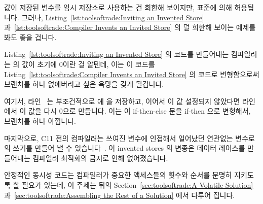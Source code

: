 {{{{값이 저장된 변수를 임시 저장소로 사용하는 건 희한해 보이지만, 표준에 의해
허용됩니다.
그러나,
Listing~\ref{lst:toolsoftrade:Inviting an Invented Store}
과~\ref{lst:toolsoftrade:Compiler Invents an Invited Store} 의 덜 희한해 보이는
예제를 봐도 좋을 겁니다.

Listing~\ref{lst:toolsoftrade:Inviting an Invented Store}
의 코드를 만들어내는 컴파일러는  의 값이 초기에 0이란 걸 알텐데, 이는 이
코드를
Listing~\ref{lst:toolsoftrade:Compiler Invents an Invited Store}
의 코드로 변형함으로써 브랜치를 하나 없애버리고 싶은 욕망을 갖게 될겁니다.

\begin{lineref}
여기서, 라인~ 는 부조건적으로  에  을 저장하고,
이어서  이 값 설정되지 않았다면 라인~ 에서 이
값을 다시 0으로 만듭니다.
이는 이 if-then-else 문을 if-then 으로 변형해서, 브랜치를 하나 아낍니다.

\end{lineref}

마지막으로, C11 전의 컴파일러는 쓰여진 변수에 인접해서 일어났던 연관없는
변수로의 쓰기를 만들어 낼 수 있습니다~\cite[Section
4.2]{Boehm:2005:TCI:1064978.1065042}.
이 invented stores 의 변종은 데이터 레이스를 만들어내는 컴파일러 최적화의
금지로 인해 없어졌습니다.

안정적인 동시성 코드는 컴파일러가 중요한 액세스들의 횟수와 순서를 분명히
지키도록 할 필요가 있는데, 이 주제는 뒤의
Section~\ref{sec:toolsoftrade:A Volatile Solution}
과~\ref{sec:toolsoftrade:Assembling the Rest of a Solution} 에서 다루어 집니다.
\iffalse

}}}}
